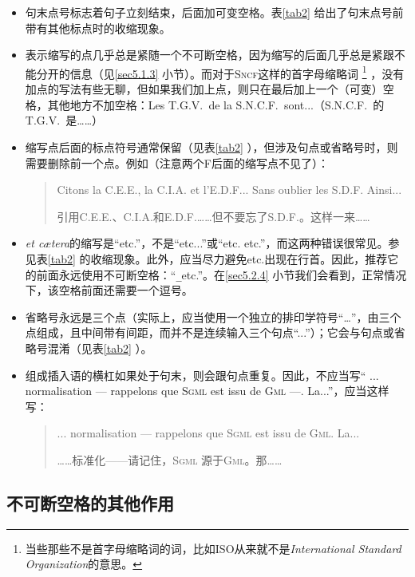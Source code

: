 \begin{itemize}
    \item 句末点号标志着句子立刻结束，后面加可变空格。表\ref{tab2} 给出了句末点号前带有其他标点时的收缩现象。
    \item 表示缩写的点几乎总是紧随一个不可断空格，因为缩写的后面几乎总是紧跟不能分开的信息（见\ref{sec5.1.3} 小节）。而对于\textsc{Sncf}这样的首字母缩略词
    \footnote{当些那些不是首字母缩略词的词，比如ISO从来就不是\emph{International Standard Organization}的意思。}
    ，没有加点的写法有些无聊，但如果我们加上点，则只在最后加上一个（可变）空格，其他地方不加空格：Les T.G.V.\verb*| |de la S.N.C.F.\verb*| |sont...（S.N.C.F.\verb*| |的T.G.V.\verb*| |是……）
    \item 缩写点后面的标点符号通常保留（见表\ref{tab2} ），但涉及句点或省略号时，则需要删除前一个点。例如（注意两个F后面的缩写点不见了）：
    \begin{quote}
        Citons la C.E.E., la C.I.A. et l’E.D.F... Sans oublier les S.D.F. Ainsi...

        \begin{bil}
            引用C.E.E.、C.I.A.和E.D.F.……但不要忘了S.D.F.。这样一来……
        \end{bil}
    \end{quote}
    \item \emph{et cætera}的缩写是“etc.”，不是“etc...”或“etc. etc.”，而这两种错误很常见。参见表\ref{tab2} 的收缩现象。此外，应当尽力避免etc.出现在行首。因此，推荐它的前面永远使用不可断空格：“\verb|_|etc.”。在\ref{sec5.2.4} 小节我们会看到，正常情况下，该空格前面还需要一个逗号。
    \item 省略号永远是三个点（实际上，应当使用一个独立的排印学符号“…”，由三个点组成，且中间带有间距，而并不是连续输入三个句点“...”）；它会与句点或省略号混淆（见表\ref{tab2} ）。
    \item 组成插入语的横杠如果处于句末，则会跟句点重复。因此，不应当写“ ... normalisation --- rappelons que \textsc{Sgml} est issu de \textsc{Gml} ---. La...”，应当这样写：
    \begin{quote}
        ... normalisation --- rappelons que \textsc{Sgml} est issu de \textsc{Gml}. La...
        
        \begin{bil}
            ……标准化——请记住，\textsc{Sgml} 源于\textsc{Gml}。那……
        \end{bil}
    \end{quote}
\end{itemize}

\subsection{不可断空格的其他作用}

